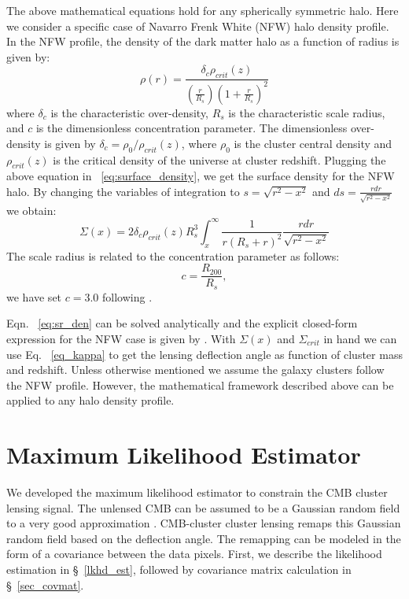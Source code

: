  The above mathematical equations hold for any spherically symmetric halo. 
 Here we consider a specific case of Navarro Frenk White (NFW) halo density profile.
 In the NFW profile, the density of the dark matter halo as a function of radius is given by:
 \begin{equation}
 \rho(r)= \frac{\delta_{c}\rho_{crit}(z)}{(\frac{r}{R_{s}})(1+\frac{r}{R_{s}})^{2}}
 \end{equation}
 where $\delta_{c}$ is the characteristic over-density, $R_{s}$ is the characteristic scale radius, and $c$ is the dimensionless concentration parameter.
 The dimensionless over-density is given by $\delta_{c} = \rho_{0}/\rho_{crit}(z)$, where $\rho_{0}$ is the cluster central density and  $\rho_{crit}(z)$  is the critical density of the universe at cluster redshift.
 Plugging the above equation in ~\ref{eq:surface_density}, we get the surface density for the NFW halo. 
 By changing the variables of integration to $s=\sqrt{r^{2} - x^{2}}$ and $ds = \frac{rdr}{\sqrt{r^{2} - x^{2}}}$ we obtain:
 \begin{equation}
 \Sigma(x) = 2\delta_{c} \rho_{crit}(z) R^{3}_{s} \int^{\infty}_{x} \frac{1}{r(R_{s} + r)^{2}} \frac{rdr}{\sqrt{r^{2} - x^{2}}}
 \label{eq:sr_den}
 \end{equation}
 The scale radius is related to the concentration parameter as follows:
 \begin{equation}
 c = \frac{R_{200}}{R_{s}},
 \end{equation}
we have set $c = 3.0$ following \cite{bhattacharya13}.
 
 
 Eqn. ~\ref{eq:sr_den} can be solved analytically and the explicit closed-form expression for the NFW case is given by \cite{bartelmann96}. 
 With $\Sigma(x)$ and $\Sigma_{crit}$ in hand we can use Eq. ~\ref{eq_kappa} to get the lensing deflection angle as function of cluster mass and redshift. 
 Unless otherwise mentioned we assume the galaxy clusters follow the NFW profile. However,  the mathematical framework described above can be applied to any halo density profile. 


\section{Maximum Likelihood Estimator}
\label{sec_MLE}
We developed the maximum likelihood estimator to constrain the CMB cluster lensing signal.
 The unlensed CMB can be assumed to be a Gaussian random field to a very good approximation  \citep{planck14d}.
 CMB-cluster cluster lensing remaps this Gaussian random field based on the deflection angle.
 The remapping can be modeled in the form of a covariance between the data pixels. 
 First, we describe the likelihood estimation in \S~\ref{lkhd_est}, followed by covariance matrix calculation in \S~\ref{sec_covmat}.
